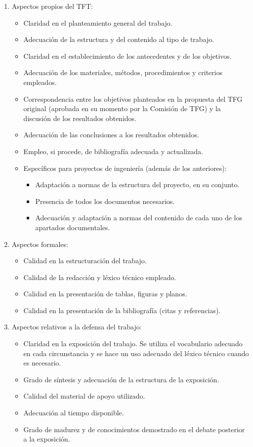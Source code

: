 \begin{enumerate}
\item Aspectos propios del TFT:
  \begin{itemize}
  \item Claridad en el planteamiento general del trabajo.
  \item Adecuación de la estructura y del contenido al tipo de trabajo.
  \item Claridad en el establecimiento de los antecedentes y de los objetivos.
  \item Adecuación de los materiales, métodos, procedimientos y criterios empleados.
  \item Correspondencia entre los objetivos planteados en la propuesta del TFG original
    (aprobada en su momento por la Comisión de TFG)    y la discusión de los resultados
    obtenidos.
  \item Adecuación de las conclusiones a los resultados obtenidos.
  \item Empleo, si procede, de bibliografía adecuada y actualizada.
  \item Específicos para proyectos de ingeniería (además de los anteriores):
    \begin{itemize}
    \item Adaptación a normas de la estructura del proyecto, en su conjunto.
    \item Presencia de todos los documentos necesarios.
    \item Adecuación y adaptación a normas del contenido de cada uno de los apartados documentales.
    \end{itemize}
  \end{itemize}
\item Aspectos formales:
  \begin{itemize}
  \item Calidad en la estructuración del trabajo.
  \item Calidad de la redacción y léxico técnico empleado.
  \item Calidad en la presentación de tablas, figuras y planos.
  \item Calidad en la presentación de la bibliografía (citas y referencias).
  \end{itemize}
\item Aspectos relativos a la defensa del trabajo:
  \begin{itemize}
  \item Claridad en la exposición del trabajo. Se utiliza el vocabulario adecuado en cada
    circunstancia y se hace un uso adecuado del léxico técnico cuando es necesario.
  \item Grado de síntesis y adecuación de la estructura de la exposición.
  \item Calidad del material de apoyo utilizado.
  \item Adecuación al tiempo disponible.
  \item Grado de madurez y de conocimientos demostrado en el debate posterior a la
    exposición.
  \end{itemize}
\end{enumerate}


